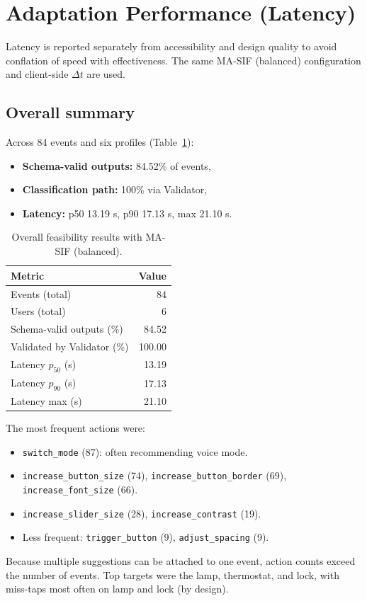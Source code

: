 \newpage
\section{Adaptation Performance (Latency)}
\label{sec:latency}
Latency is reported separately from accessibility and design quality to avoid conflation of speed with effectiveness. The same MA-SIF (balanced) configuration and client-side $\Delta t$ are used.

\subsection{Overall summary}
Across 84 events and six profiles (Table~\ref{tab:overall-feasibility}):
\begin{itemize}
  \item \textbf{Schema-valid outputs:} 84.52\% of events,
  \item \textbf{Classification path:} 100\% via Validator,
  \item \textbf{Latency:} p50 13.19 s, p90 17.13 s, max 21.10 s.
\end{itemize}

\begin{table}[H]
\centering
\caption{Overall feasibility results with MA-SIF (balanced).}
\label{tab:overall-feasibility}
\begin{tabular}{lr}
\toprule
\textbf{Metric} & \textbf{Value} \\
\midrule
Events (total) & 84 \\
Users (total) & 6 \\
Schema-valid outputs (\%) & 84.52 \\
Validated by Validator (\%) & 100.00 \\
Latency $p_{50}$ (s) & 13.19 \\
Latency $p_{90}$ (s) & 17.13 \\
Latency max (s) & 21.10 \\
\bottomrule
\end{tabular}
\end{table}

The most frequent actions were:
\begin{itemize}
    \item \texttt{switch\_mode} (87): often recommending voice mode.
    \item \texttt{increase\_button\_size} (74), \texttt{increase\_button\_border} (69), \texttt{increase\_font\_size} (66).
    \item \texttt{increase\_slider\_size} (28), \texttt{increase\_contrast} (19).
    \item Less frequent: \texttt{trigger\_button} (9), \texttt{adjust\_spacing} (9).
\end{itemize}
Because multiple suggestions can be attached to one event, action counts exceed the number of events. Top targets were the lamp, thermostat, and lock, with miss-taps most often on lamp and lock (by design).

